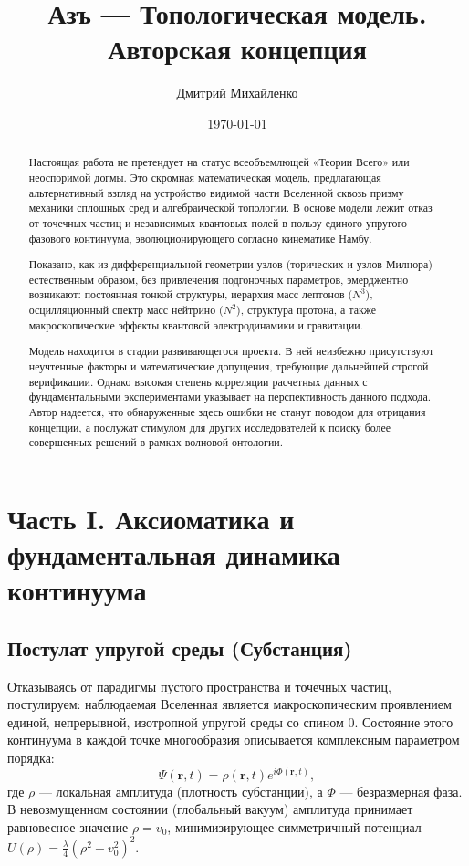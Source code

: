 \documentclass[12pt,a4paper]{article}
\title{Азъ — Топологическая модель. Авторская концепция}
\author{Дмитрий Михайленко}
\date{\today}
\begin{document}
	
\maketitle

\begin{abstract}
	Настоящая работа не претендует на статус всеобъемлющей «Теории Всего» или неоспоримой догмы. Это скромная математическая модель, предлагающая альтернативный взгляд на устройство видимой части Вселенной сквозь призму механики сплошных сред и алгебраической топологии. В основе модели лежит отказ от точечных частиц и независимых квантовых полей в пользу единого упругого фазового континуума, эволюционирующего согласно кинематике Намбу. 
	
	Показано, как из дифференциальной геометрии узлов (торических и узлов Милнора) естественным образом, без привлечения подгоночных параметров, эмерджентно возникают: постоянная тонкой структуры, иерархия масс лептонов ($N^3$), осцилляционный спектр масс нейтрино ($N^2$), структура протона, а также макроскопические эффекты квантовой электродинамики и гравитации.
	
	Модель находится в стадии развивающегося проекта. В ней неизбежно присутствуют неучтенные факторы и математические допущения, требующие дальнейшей строгой верификации. Однако высокая степень корреляции расчетных данных с фундаментальными экспериментами указывает на перспективность данного подхода. Автор надеется, что обнаруженные здесь ошибки не станут поводом для отрицания концепции, а послужат стимулом для других исследователей к поиску более совершенных решений в рамках волновой онтологии.
\end{abstract}

	\section{Часть I. Аксиоматика и фундаментальная динамика континуума}

	\subsection{Постулат упругой среды (Субстанция)}
Отказываясь от парадигмы пустого пространства и точечных частиц, постулируем: наблюдаемая Вселенная является макроскопическим проявлением единой, непрерывной, изотропной упругой среды со спином 0. Состояние этого континуума в каждой точке многообразия описывается комплексным параметром порядка:
	\begin{equation}
	\Psi(\mathbf{r}, t) = \rho(\mathbf{r}, t) e^{i\Phi(\mathbf{r}, t)},
	\end{equation}
где $\rho$ — локальная амплитуда (плотность субстанции), а $\Phi$ — безразмерная фаза. В невозмущенном состоянии (глобальный вакуум) амплитуда принимает равновесное значение $\rho = v_0$, минимизирующее симметричный потенциал $U(\rho) = \frac{\lambda}{4}(\rho^2 - v_0^2)^2$.
\end{document}

